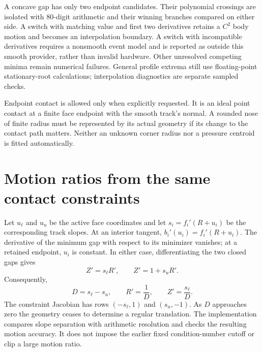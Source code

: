 \documentclass[11pt,letterpaper]{article}
\numberwithin{equation}{section}
\begin{document}
A concave gap has only two endpoint candidates. Their polynomial crossings
are isolated with 80-digit arithmetic and their winning branches compared
on either side. A switch with matching value and first two derivatives
retains a $C^2$ body motion and becomes an interpolation boundary. A switch
with incompatible derivatives requires a nonsmooth event model and is
reported as outside this smooth provider, rather than invalid hardware.
Other unresolved competing minima remain numerical failures. General
profile extrema still use floating-point stationary-root calculations;
interpolation diagnostics are separate sampled checks.

Endpoint contact is allowed only when explicitly requested. It is an ideal
point contact at a finite face endpoint with the smooth track's normal.
A rounded nose of finite radius must be represented by its actual geometry
if its change to the contact path matters. Neither an unknown corner radius
nor a pressure centroid is fitted automatically.

\section{Motion ratios from the same contact constraints}

Let $u_\ell$ and $u_u$ be the active face coordinates and let
$s_i=f_i'(R+u_i)$ be the corresponding track slopes. At an interior tangent,
$b_i'(u_i)=f_i'(R+u_i)$. The derivative of the minimum gap with respect to its
minimizer vanishes; at a retained endpoint, $u_i$ is constant. In either case,
differentiating the two closed gaps gives
\begin{equation}
 Z'=s_\ell R',\qquad Z'=1+s_u R'.
\end{equation}
Consequently,
\begin{equation}
 D=s_\ell-s_u,\qquad R'=\frac1D,\qquad Z'=\frac{s_\ell}{D}.
 \label{eq:first}
\end{equation}
The constraint Jacobian has rows $(-s_\ell,1)$ and $(s_u,-1)$.
As $D$ approaches zero the geometry ceases to determine a regular translation.
The implementation compares slope separation with arithmetic resolution
and checks the resulting motion accuracy. It does not impose the earlier
fixed condition-number cutoff or clip a large motion ratio.
\end{document}
